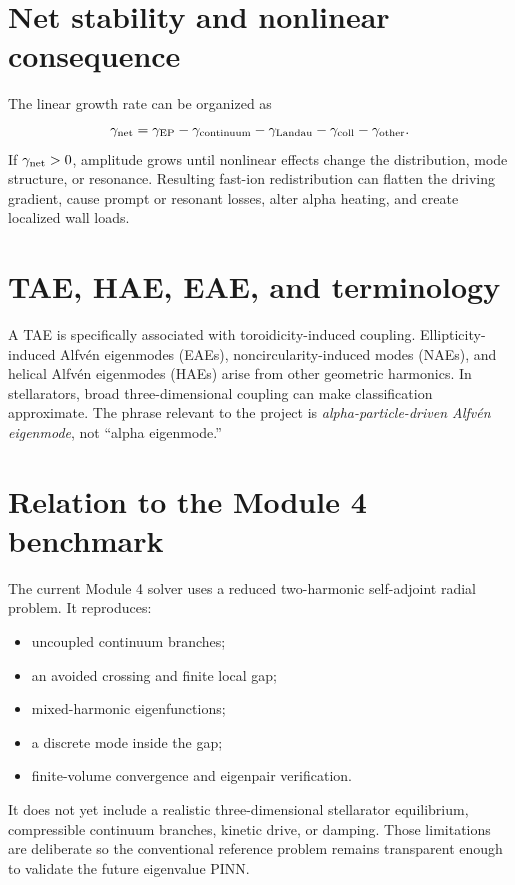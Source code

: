 \documentclass[11pt]{article}
\begin{document}
\section{Net stability and nonlinear consequence}

The linear growth rate can be organized as
\begin{equation}
\gamma_{\rm net}=
\gamma_{\rm EP}
-\gamma_{\rm continuum}
-\gamma_{\rm Landau}
-\gamma_{\rm coll}
-\gamma_{\rm other}.
\end{equation}
If $\gamma_{\rm net}>0$, amplitude grows until nonlinear effects change the distribution, mode structure, or resonance. Resulting fast-ion redistribution can flatten the driving gradient, cause prompt or resonant losses, alter alpha heating, and create localized wall loads.


\section{TAE, HAE, EAE, and terminology}

A TAE is specifically associated with toroidicity-induced coupling. Ellipticity-induced Alfvén eigenmodes (EAEs), noncircularity-induced modes (NAEs), and helical Alfvén eigenmodes (HAEs) arise from other geometric harmonics. In stellarators, broad three-dimensional coupling can make classification approximate. The phrase relevant to the project is \emph{alpha-particle-driven Alfvén eigenmode}, not ``alpha eigenmode.''


\section{Relation to the Module 4 benchmark}

The current Module 4 solver uses a reduced two-harmonic self-adjoint radial problem. It reproduces:
\begin{itemize}[leftmargin=1.6em]
\item uncoupled continuum branches;
\item an avoided crossing and finite local gap;
\item mixed-harmonic eigenfunctions;
\item a discrete mode inside the gap;
\item finite-volume convergence and eigenpair verification.
\end{itemize}
It does not yet include a realistic three-dimensional stellarator equilibrium, compressible continuum branches, kinetic drive, or damping. Those limitations are deliberate so the conventional reference problem remains transparent enough to validate the future eigenvalue PINN.
\end{document}
